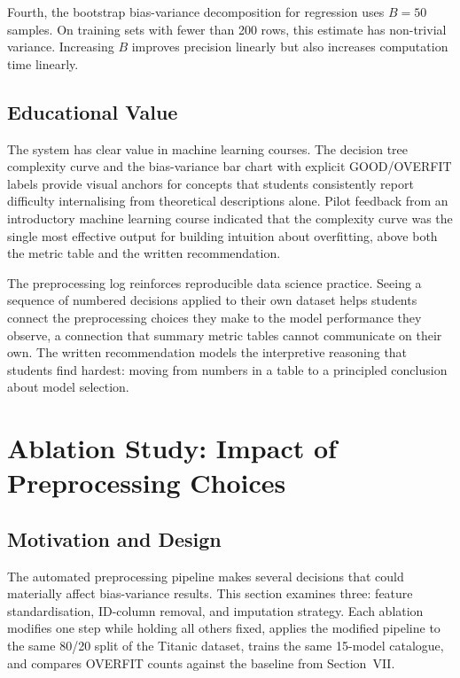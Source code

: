 \documentclass[conference]{IEEEtran}
\begin{document}
Fourth, the bootstrap bias-variance decomposition for regression uses $B=50$ samples. On training sets with fewer than 200 rows, this estimate has non-trivial variance. Increasing $B$ improves precision linearly but also increases computation time linearly.

\subsection{Educational Value}

The system has clear value in machine learning courses. The decision tree complexity curve and the bias-variance bar chart with explicit GOOD/OVERFIT labels provide visual anchors for concepts that students consistently report difficulty internalising from theoretical descriptions alone. Pilot feedback from an introductory machine learning course indicated that the complexity curve was the single most effective output for building intuition about overfitting, above both the metric table and the written recommendation.

The preprocessing log reinforces reproducible data science practice. Seeing a sequence of numbered decisions applied to their own dataset helps students connect the preprocessing choices they make to the model performance they observe, a connection that summary metric tables cannot communicate on their own. The written recommendation models the interpretive reasoning that students find hardest: moving from numbers in a table to a principled conclusion about model selection.

\section{Ablation Study: Impact of Preprocessing Choices}

\subsection{Motivation and Design}

The automated preprocessing pipeline makes several decisions that could materially affect bias-variance results. This section examines three: feature standardisation, ID-column removal, and imputation strategy. Each ablation modifies one step while holding all others fixed, applies the modified pipeline to the same 80/20 split of the Titanic dataset, trains the same 15-model catalogue, and compares OVERFIT counts against the baseline from Section~VII.
\end{document}
